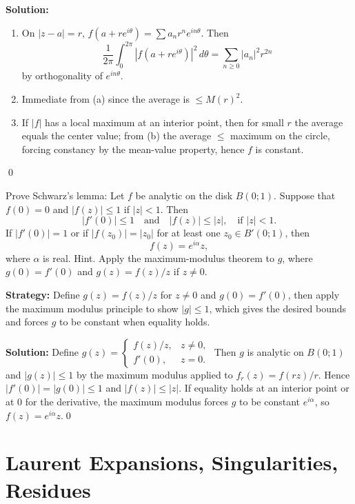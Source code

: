 \bigskip\noindent\textbf{Solution:}
\begin{enumerate}[label=(\alph*)]
\item On $|z-a|=r$, $f(a+re^{i\theta})=\sum a_n r^n e^{in\theta}$. Then
\[\frac{1}{2\pi}\int_0^{2\pi}|f(a+re^{i\theta})|^2\,d\theta=\sum_{n\ge0}|a_n|^2 r^{2n}\]
by orthogonality of $e^{in\theta}$.
\item Immediate from (a) since the average is $\le M(r)^2$.
\item If $|f|$ has a local maximum at an interior point, then for small $r$ the average equals the center value; from (b) the average $\le$ maximum on the circle, forcing constancy by the mean-value property, hence $f$ is constant.
\end{enumerate}\qed


\begin{problembox}
\begin{problemstatement}
Prove Schwarz's lemma: Let \( f \) be analytic on the disk \( B(0; 1) \). Suppose that \( f(0) = 0 \) and \( |f(z)| \leq 1 \) if \( |z| < 1 \). Then
\[ |f'(0)| \leq 1 \quad \text{and} \quad |f(z)| \leq |z|, \quad \text{if } |z| < 1. \]
If \( |f'(0)| = 1 \) or if \( |f(z_0)| = |z_0| \) for at least one \( z_0 \in B'(0; 1) \), then
\[ f(z) = e^{i\alpha} z, \]
where \( \alpha \) is real. Hint. Apply the maximum-modulus theorem to \( g \), where \( g(0) = f'(0) \) and \( g(z) = f(z)/z \) if \( z \neq 0 \).
\end{problemstatement}
\end{problembox}

\noindent\textbf{Strategy:} Define \( g(z) = f(z)/z \) for \( z \neq 0 \) and \( g(0) = f'(0) \), then apply the maximum modulus principle to show \( |g| \leq 1 \), which gives the desired bounds and forces \( g \) to be constant when equality holds.

\bigskip\noindent\textbf{Solution:}
Define $g(z)=\begin{cases} f(z)/z,& z\ne0,\\ f'(0),& z=0.\end{cases}$ Then $g$ is analytic on $B(0;1)$ and $|g(z)|\le1$ by the maximum modulus applied to $f_r(z)=f(rz)/r$. Hence $|f'(0)|=|g(0)|\le1$ and $|f(z)|\le |z|$. If equality holds at an interior point or at $0$ for the derivative, the maximum modulus forces $g$ to be constant $e^{i\alpha}$, so $f(z)=e^{i\alpha}z$.\qed
\section{Laurent Expansions, Singularities, Residues}

